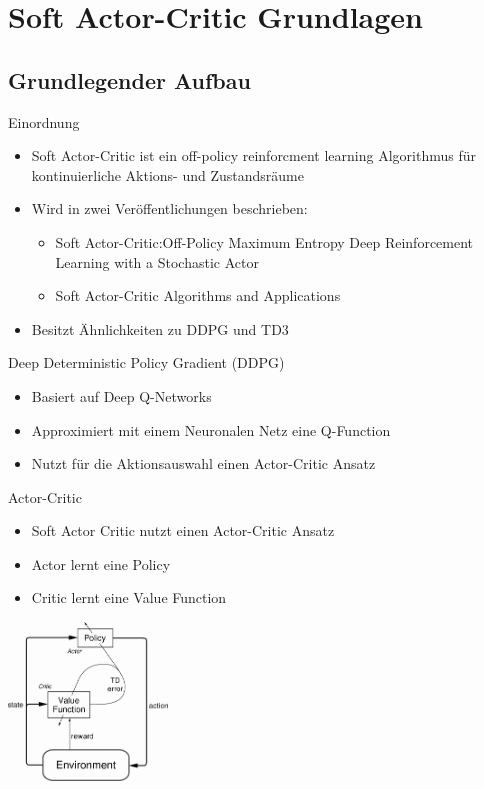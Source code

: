 \section{Soft Actor-Critic Grundlagen}
\subsection{Grundlegender Aufbau}
\begin{frame}{Einordnung}
	\begin{itemize}
		\item Soft Actor-Critic ist ein off-policy reinforcment learning Algorithmus für kontinuierliche Aktions- und Zustandsräume 
		\item Wird in zwei Veröffentlichungen beschrieben:
		\begin{itemize}
			\item Soft Actor-Critic:Off-Policy Maximum Entropy Deep Reinforcement Learning with a Stochastic Actor
			\item Soft Actor-Critic Algorithms and Applications
		\end{itemize}
		\item Besitzt Ähnlichkeiten zu DDPG und TD3 
	\end{itemize} 
\end{frame}

\begin{frame}{Deep Deterministic Policy Gradient (DDPG)}
	\begin{itemize}
		\item Basiert auf Deep Q-Networks
		\item Approximiert mit einem Neuronalen Netz eine Q-Function
		\item Nutzt für die Aktionsauswahl einen Actor-Critic Ansatz
	\end{itemize} 
\end{frame}

\begin{frame}{Actor-Critic}
	\begin{itemize}
		\item Soft Actor Critic nutzt einen Actor-Critic Ansatz
		\item Actor lernt eine Policy
		\item Critic lernt eine Value Function
	\end{itemize} 
	\includegraphics[width=120pt]{figures/figtmp34.png}
	\cite{actorcritic}
\end{frame}

